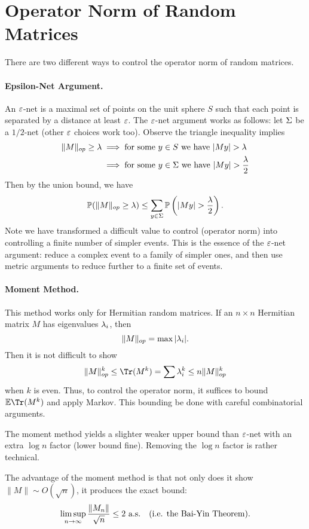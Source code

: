 \section*{Operator Norm of Random Matrices}

There are two different ways to control the operator norm of random matrices.

\paragraph{Epsilon-Net Argument.} An $\e$-net is a maximal set of points on the unit sphere $S$ such that each point is separated by a distance at least $\e$. The $\e$-net argument works as follows: let $\S$ be a $1/2$-net (other $\e$ choices work too). Observe the triangle inequality implies
\[
    \begin{split}
        \|M\|_{op} \ge \l & \implies \text{for some $y \in S$ we have } |My| > \l            \\
                          & \implies \text{for some $y \in \S$ we have } |My| > \frac{\l}{2} \\
    \end{split}
\]
Then by the union bound, we have
\[
    \bP(\|M\|_{op} \ge \l) \le \sum_{y \in \S} \bP\left(|My| > \frac{\l}{2}\right).
\]
Note we have transformed a difficult value to control (operator norm) into controlling a finite number of simpler events. This is the essence of the $\e$-net argument: reduce a complex event to a family of simpler ones, and then use metric arguments to reduce further to a finite set of events.

\paragraph{Moment Method.} This method works only for Hermitian random matrices. If an $n \times n$ Hermitian matrix $M$ has eigenvalues $\l_i$, then
\[
    \|M\|_{op} = \max |\l_i|.
\]
Then it is not difficult to show
\[
    \|M\|^k_{op} \leq \Tr(M^k) = \sum \l_i^k \leq n\|M\|^k_{op}
\]
when $k$ is even. Thus, to control the operator norm, it suffices to bound $\bE \Tr(M^k)$ and apply Markov. This bounding be done with careful combinatorial arguments.

The moment method yields a slighter weaker upper bound than $\e$-net with an extra $\log n$ factor (lower bound fine). Removing the $\log n$ factor is rather technical.

The advantage of the moment method is that not only does it show $\|M\| \sim O(\sqrt{n})$, it produces the exact bound:
\[
    \limsup_{n \to \i} \frac{\|M_n\|}{\sqrt{n}} \le 2 \ \text{a.s.} \quad (\text{i.e. the Bai-Yin Theorem}).
\]

